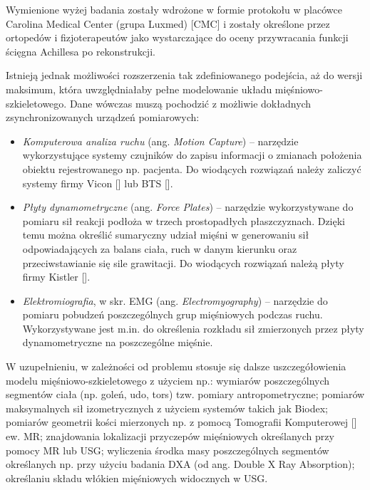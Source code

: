 Wymienione wyżej badania zostały wdrożone w formie protokołu w placówce Carolina Medical Center (grupa Luxmed) [CMC] i zostały określone przez ortopedów i fizjoterapeutów jako wystarczające do oceny przywracania funkcji ścięgna Achillesa po rekonstrukcji. 

Istnieją jednak możliwości rozszerzenia tak zdefiniowanego podejścia, aż do wersji maksimum, która uwzględniałaby pełne modelowanie układu mięśniowo-szkieletowego. Dane wówczas muszą pochodzić z możliwie dokładnych zsynchronizowanych urządzeń pomiarowych:
\begin{itemize}
	\item \textit{Komputerowa analiza ruchu} (ang. \textit{Motion Capture}) -- narzędzie wykorzystujące systemy czujników do zapisu informacji o zmianach położenia obiektu rejestrowanego np. pacjenta. Do wiodących rozwiązań należy zaliczyć systemy firmy Vicon [] lub BTS [].
	\item \textit{Płyty dynamometryczne} (ang. \textit{Force Plates}) -- narzędzie wykorzystywane do pomiaru sił reakcji podłoża w trzech prostopadłych płaszczyznach. Dzięki temu można określić sumaryczny udział mięśni w generowaniu sił odpowiadających za balans ciała, ruch w danym kierunku oraz przeciwstawianie się sile grawitacji. Do wiodących rozwiązań należą płyty firmy Kistler [].
	\item \textit{Elektromiografia}, w skr. EMG (ang. \textit{Electromyography}) -- narzędzie do pomiaru pobudzeń poszczególnych grup mięśniowych podczas ruchu. Wykorzystywane jest m.in. do określenia rozkładu sił zmierzonych przez płyty dynamometryczne na poszczególne mięśnie.
\end{itemize}

W uzupełnieniu, w zależności od problemu stosuje się dalsze uszczegółowienia modelu mięśniowo-szkieletowego z użyciem np.: wymiarów poszczególnych segmentów ciała (np. goleń, udo, tors) tzw. pomiary antropometryczne; pomiarów maksymalnych sił izometrycznych z użyciem systemów takich jak Biodex; pomiarów geometrii kości mierzonych np. z pomocą Tomografii Komputerowej [] ew. MR; znajdowania lokalizacji przyczepów mięśniowych określanych przy pomocy MR lub USG; wyliczenia środka masy poszczególnych segmentów określanych np. przy użyciu badania DXA (od ang. Double X Ray Absorption); określaniu składu włókien mięśniowych widocznych w USG.

